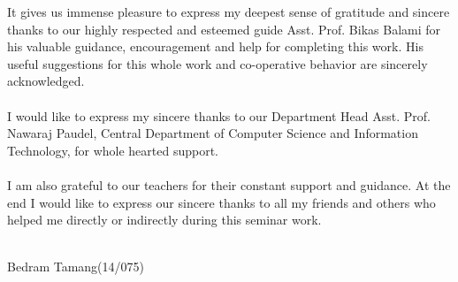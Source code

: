 It gives us immense pleasure to express my deepest sense of gratitude and sincere thanks to our highly respected and esteemed guide Asst. Prof. Bikas Balami for his valuable guidance, encouragement and help for completing this work. His useful suggestions for this whole work and co-operative behavior are sincerely acknowledged.
\\\\
I would like to express my sincere thanks to our Department Head Asst. Prof. Nawaraj Paudel, Central Department of Computer Science and Information Technology, for whole hearted support.
\\\\
I am also grateful to our teachers for their constant support and guidance. At the end I would like to express our sincere thanks to all my friends and others who helped me directly or indirectly during this seminar work.
\\\\
\begin{flushright}
	Bedram Tamang(14/075)
\end{flushright}